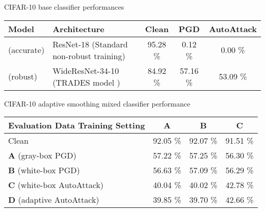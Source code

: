 \documentclass[11pt, letterpaper]{article}
\theoremstyle{plain}
\theoremstyle{definition}
\begin{document}
\begin{table}[!tb]
	\centering
	\vspace{-2mm}
	\label{tab:cifar10}
	\vspace{-.5mm}
	\begin{small}
		CIFAR-10 base classifier performances \\
		\begin{tabular}{l|l!{\vrule width 2pt}c|c|c}
			\toprule
			Model & \footnotesize{Architecture} & Clean & PGD & AutoAttack \\
			\midrule
			 \scriptsize{(accurate)} & ResNet-18 \scriptsize{(Standard non-robust training)} & 95.28 \% & 0.12 \% & 0.00 \% \\
			 \scriptsize{(robust)} & WideResNet-34-10 \scriptsize{(TRADES model \citep{Zhang19})} & 84.92 \% & 57.16 \% & 53.09 \% \\
			\bottomrule
		\end{tabular}
		
		\vspace{1.5mm}
		CIFAR-10 adaptive smoothing mixed classifier  performance \\
		\begin{tabular}{l!{\vrule width 2pt}c|c|c}
			\toprule
			Evaluation Data  Training Setting & \textbf{A} & \textbf{B} & \textbf{C} \\
			\midrule
			Clean 								   		   & 92.05 \% & 92.07 \% & 91.51 \% \\
			\textbf{A} \scriptsize{(gray-box PGD)}  & 57.22 \% & 57.25 \% & 56.30 \% \\
			\textbf{B} \scriptsize{(white-box PGD)} & 56.63 \% & 57.09 \% & 56.29 \% \\
			\textbf{C} \scriptsize{(white-box AutoAttack)} & 40.04 \% & 40.02 \% & 42.78 \% \\
			\textbf{D} \scriptsize{(adaptive AutoAttack)}  & 39.85 \% & 39.70 \% & 42.66 \% \\
			\bottomrule
		\end{tabular}
	\end{small}
	\vspace{-1mm}
\end{table}
\end{document}
